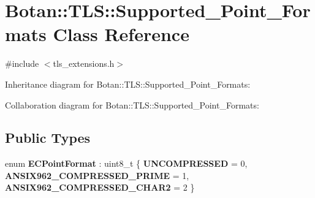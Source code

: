 \hypertarget{class_botan_1_1_t_l_s_1_1_supported___point___formats}{}\section{Botan\+:\+:T\+LS\+:\+:Supported\+\_\+\+Point\+\_\+\+Formats Class Reference}
\label{class_botan_1_1_t_l_s_1_1_supported___point___formats}


{\ttfamily \#include $<$tls\+\_\+extensions.\+h$>$}



Inheritance diagram for Botan\+:\+:T\+LS\+:\+:Supported\+\_\+\+Point\+\_\+\+Formats\+:


Collaboration diagram for Botan\+:\+:T\+LS\+:\+:Supported\+\_\+\+Point\+\_\+\+Formats\+:
\subsection*{Public Types}
\begin{DoxyCompactItemize}
\item 
\mbox{\label{class_botan_1_1_t_l_s_1_1_supported___point___formats_aff34df036ad6c7ca42d6ccc2ae3696cf}} 
enum {\bfseries E\+C\+Point\+Format} \+: uint8\+\_\+t \{ {\bfseries U\+N\+C\+O\+M\+P\+R\+E\+S\+S\+ED} = 0, 
{\bfseries A\+N\+S\+I\+X962\+\_\+\+C\+O\+M\+P\+R\+E\+S\+S\+E\+D\+\_\+\+P\+R\+I\+ME} = 1, 
{\bfseries A\+N\+S\+I\+X962\+\_\+\+C\+O\+M\+P\+R\+E\+S\+S\+E\+D\+\_\+\+C\+H\+A\+R2} = 2
 \}
\end{DoxyCompactItemize}
